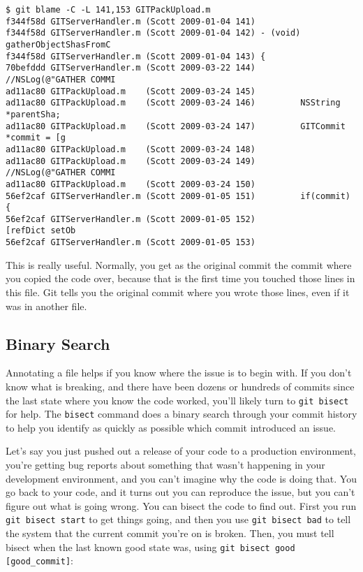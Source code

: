 \documentclass[a4paper]{book}
\begin{document}
\begin{shaded}\begin{verbatim}
$ git blame -C -L 141,153 GITPackUpload.m
f344f58d GITServerHandler.m (Scott 2009-01-04 141)
f344f58d GITServerHandler.m (Scott 2009-01-04 142) - (void) gatherObjectShasFromC
f344f58d GITServerHandler.m (Scott 2009-01-04 143) {
70befddd GITServerHandler.m (Scott 2009-03-22 144)         //NSLog(@"GATHER COMMI
ad11ac80 GITPackUpload.m    (Scott 2009-03-24 145)
ad11ac80 GITPackUpload.m    (Scott 2009-03-24 146)         NSString *parentSha;
ad11ac80 GITPackUpload.m    (Scott 2009-03-24 147)         GITCommit *commit = [g
ad11ac80 GITPackUpload.m    (Scott 2009-03-24 148)
ad11ac80 GITPackUpload.m    (Scott 2009-03-24 149)         //NSLog(@"GATHER COMMI
ad11ac80 GITPackUpload.m    (Scott 2009-03-24 150)
56ef2caf GITServerHandler.m (Scott 2009-01-05 151)         if(commit) {
56ef2caf GITServerHandler.m (Scott 2009-01-05 152)                 [refDict setOb
56ef2caf GITServerHandler.m (Scott 2009-01-05 153)
\end{verbatim}\end{shaded}

This is really useful. Normally, you get as the original commit the commit where you copied the code over, because that is the first time you touched those lines in this file. Git tells you the original commit where you wrote those lines, even if it was in another file.

\subsection{Binary Search}\label{binary-search}

Annotating a file helps if you know where the issue is to begin with. If you don't know what is breaking, and there have been dozens or hundreds of commits since the last state where you know the code worked, you'll likely turn to \texttt{git bisect} for help. The \texttt{bisect} command does a binary search through your commit history to help you identify as quickly as possible which commit introduced an issue.

Let's say you just pushed out a release of your code to a production environment, you're getting bug reports about something that wasn't happening in your development environment, and you can't imagine why the code is doing that. You go back to your code, and it turns out you can reproduce the issue, but you can't figure out what is going wrong. You can bisect the code to find out. First you run \texttt{git bisect start} to get things going, and then you use \texttt{git bisect bad} to tell the system that the current commit you're on is broken. Then, you must tell bisect when the last known good state was, using \texttt{git bisect good {[}good\_commit{]}}:
\end{document}
